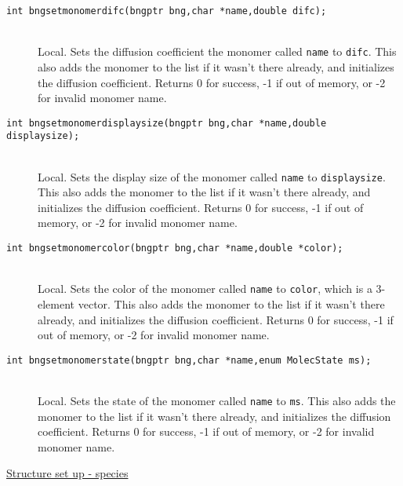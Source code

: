 \documentclass {book}
\begin{document}
\begin{description}
\item[\texttt{int bngsetmonomerdifc(bngptr bng,char *name,double difc);}]
\hfill \\
Local. Sets the diffusion coefficient the monomer called \texttt{name} to \texttt{difc}. This also adds the monomer to the list if it wasn't there already, and initializes the diffusion coefficient. Returns 0 for success, -1 if out of memory, or -2 for invalid monomer name.

\item[\texttt{int bngsetmonomerdisplaysize(bngptr bng,char *name,double displaysize);}]
\hfill \\
Local. Sets the display size of the monomer called \texttt{name} to \texttt{displaysize}. This also adds the monomer to the list if it wasn't there already, and initializes the diffusion coefficient. Returns 0 for success, -1 if out of memory, or -2 for invalid monomer name.

\item[\texttt{int bngsetmonomercolor(bngptr bng,char *name,double *color);}]
\hfill \\
Local. Sets the color of the monomer called \texttt{name} to \texttt{color}, which is a 3-element vector. This also adds the monomer to the list if it wasn't there already, and initializes the diffusion coefficient. Returns 0 for success, -1 if out of memory, or -2 for invalid monomer name.

\item[\texttt{int bngsetmonomerstate(bngptr bng,char *name,enum MolecState ms);}]
\hfill \\
Local. Sets the state of the monomer called \texttt{name} to \texttt{ms}. This also adds the monomer to the list if it wasn't there already, and initializes the diffusion coefficient. Returns 0 for success, -1 if out of memory, or -2 for invalid monomer name.

\item[\underline{Structure set up - species}]


\end{description}
\end{document}
